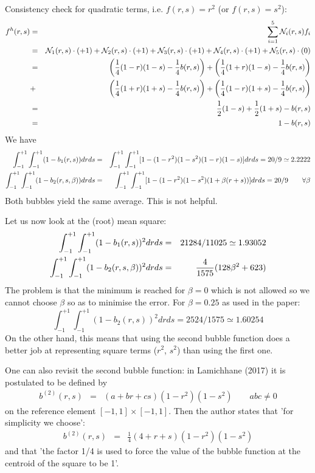 \begin{itemize}
Consistency check for quadratic terms, i.e. $f(r,s)=r^2$ (or $f(r,s)=s^2$): 
\begin{eqnarray}
f^h(r,s) 
&=& \sum_{i=1}^5 {\mathcal{N}}_i(r,s) f_i \nonumber\\
&=& {\mathcal{N}}_1(r,s)\cdot (+1) + {\mathcal{N}}_2(r,s)\cdot (+1) + {\mathcal{N}}_3(r,s)\cdot (+1) + {\mathcal{N}}_4(r,s)\cdot (+1) + {\mathcal{N}}_5(r,s)\cdot (0) \nonumber\\
&=& 
\left(\frac{1}{4}(1-r)(1-s)-\frac{1}{4}b(r,s)\right)
+\left(\frac{1}{4}(1+r)(1-s)-\frac{1}{4}b(r,s)\right) \nonumber\\
&+& 
\left(\frac{1}{4}(1+r)(1+s)-\frac{1}{4}b(r,s)\right)
+\left(\frac{1}{4}(1-r)(1+s)-\frac{1}{4}b(r,s)\right) \nonumber\\
&=&
\frac{1}{2}(1-s) + \frac{1}{2}(1+s) -b(r,s) \nonumber\\
&=& 
1 - b(r,s) 
\end{eqnarray}
We have 
\begin{eqnarray}
\int_{-1}^{+1} \int_{-1}^{+1} (1-b_1(r,s)) dr ds  
&=& \int_{-1}^{+1} \int_{-1}^{+1} [1 - (1-r^2)(1-s^2)(1-r)(1-s) ] dr ds = 20/9 \simeq 2.2222 \nonumber\\
\int_{-1}^{+1} \int_{-1}^{+1} (1-b_2(r,s,\beta)) dr ds  
&=& \int_{-1}^{+1} \int_{-1}^{+1} [1 - (1-r^2)(1-s^2)(1+\beta(r+s)) ] dr ds = 20/9  \qquad \forall \beta \nonumber 
\end{eqnarray}
Both bubbles yield the same average. This is not helpful. 

Let us now look at the (root) mean square:
\begin{eqnarray}
\int_{-1}^{+1} \int_{-1}^{+1} (1-b_1(r,s))^2 dr ds &=& 21284/11025 \simeq 1.93052 \nonumber\\
\int_{-1}^{+1} \int_{-1}^{+1} (1-b_2(r,s,\beta))^2 dr ds &=& \frac{4}{1575} (128 \beta^2  + 623) 
\end{eqnarray}
The problem is that the minimum is reached for $\beta=0$ which is not allowed so 
we cannot choose $\beta$ so as to minimise the error.
For $\beta=0.25$ as used in the paper:
\[
\int_{-1}^{+1} \int_{-1}^{+1} (1-b_2(r,s))^2 dr ds = 2524/1575 \simeq 1.60254 
\]
On the other hand, this means that using the second bubble function does a better job  
at representing square terms ($r^2$, $s^2$) than using the first one. 

\end{itemize}

One can also revisit the second bubble function: in Lamichhane (2017) \cite{lami17}
it is postulated to be defined by 
\begin{eqnarray}
b^{(2)}(r,s) &=& (a+br+cs)(1-r^2)(1-s^2) \qquad abc\neq 0
\end{eqnarray}
on the reference element $[-1,1]\times [-1,1]$. Then the author 
states that 'for simplicity we choose':
\begin{eqnarray}
b^{(2)}(r,s) &=& \frac{1}{4} (4+r+s)(1-r^2)(1-s^2) 
\end{eqnarray}
and that 'the factor 1/4 is used to force the value of the bubble function at
the centroid of the square to be 1'.

